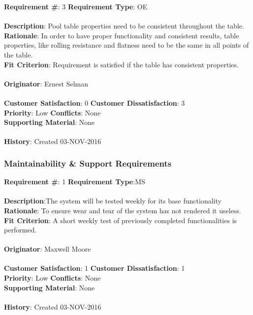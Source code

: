 \documentclass[titlepage]{article}
\begin{document}
\begin{framed}
	\noindent\textbf{Requirement \#}: 3 \hfill \textbf{Requirement Type}: OE\hfill\\\\
	\noindent\textbf{Description}: Pool table properties need to be consistent throughout the table. \\
	\textbf{Rationale}: In order to have proper functionality and consistent results, table properties, like rolling resistance and flatness need to be the same in all points of the table. \\
	\textbf{Fit Criterion}: Requirement is satisfied if the table has consistent properties. \\\\
	\textbf{Originator}: Ernest Selman\\\\
	\noindent\textbf{Customer Satisfaction}: 0 \hfill 	\textbf{Customer Dissatisfaction}: 3 \hfill\\
	\textbf{Priority}: Low \hfill \textbf{Conflicts}: None \hfill\\
	\textbf{Supporting Material}: None\\\\
	\noindent\textbf{History}: Created 03-NOV-2016
\end{framed}

\subsubsection{Maintainability \& Support Requirements}
\begin{framed}
	\noindent\textbf{Requirement \#}: 1 \hfill \textbf{Requirement Type}:MS \hfill\\\\
	\noindent\textbf{Description}:The system will be tested weekly for its base functionality\\
	\textbf{Rationale}: To ensure wear and tear of the system has not rendered it useless.\\
	\textbf{Fit Criterion}: A short weekly test of previously completed functionalities is performed.\\\\
	\textbf{Originator}: Maxwell Moore\\\\
	\noindent\textbf{Customer Satisfaction}: 1 \hfill 	\textbf{Customer Dissatisfaction}: 1 \hfill\\
	\textbf{Priority}: Low \hfill \textbf{Conflicts}: None \hfill\\
	\textbf{Supporting Material}: None\\\\
	\noindent\textbf{History}: Created 03-NOV-2016
\end{framed}
\end{document}
